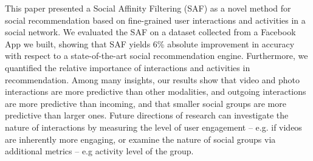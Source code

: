 
This paper presented a Social Affinity Filtering (SAF) as a novel method
for social recommendation based on fine-grained user interactions and
activities in a social network. We evaluated the SAF on a dataset collected 
from a Facebook App we built, showing that SAF yields 6\% absolute improvement
in accuracy with respect to a state-of-the-art social recommendation engine.
Furthermore, we quantified the relative importance of interactions and activities in recommendation.
Among many insights, our results show
that video and photo interactions are more predictive than other
modalities, and outgoing interactions are more predictive than
incoming, and that smaller social groups are more predictive than
larger ones. Future directions of research can investigate the nature
of interactions by measuring the level of user engagement -- e.g. if
videos are inherently more engaging, or examine the nature of social
groups via additional metrics -- e.g activity level of the group.

